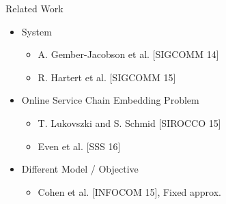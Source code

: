 \begin{frame}[<+->]{Related Work}

\begin{itemize}
  \item System
  	\begin{itemize}
    	\item A. Gember-Jacobson et al. [SIGCOMM 14]
    	\item R. Hartert et al. [SIGCOMM 15]
	\end{itemize}
  
  \item Online Service Chain Embedding Problem
  	\begin{itemize}
		\item T. Lukovszki and S. Schmid [SIROCCO 15] 
		\item Even et al. [SSS 16]
	\end{itemize}
	
  \item Different Model / Objective
  	\begin{itemize}
    	\item Cohen et al. [INFOCOM 15], Fixed approx.
	\end{itemize} 
\end{itemize}
\end{frame}